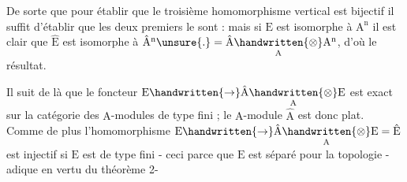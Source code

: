 De sorte que pour établir que le troisième homomorphisme vertical est bijectif il suffit d'établir que les deux premiers le sont : mais si $\mathrm E$ est isomorphe à $\mathrm A^{\mathrm n}$ il est clair que $\hat{\mathrm E}$ est isomorphe à $\hat{\mathrm A}^{\mathrm n}\unsure{.}=\hat{\mathrm A}\underset{\mathrm A}{\handwritten{\otimes}}\mathrm A^{\mathrm n}$, d'où le résultat.

Il suit de là que le foncteur $\mathrm E\handwritten{\to}\hat{\mathrm A}\underset{\mathrm A}{\handwritten{\otimes}}\mathrm E$ est exact sur la catégorie des $\mathrm A$-modules de type fini ; le $\mathrm A$-module $\hat{\mathrm A}$ est donc plat. Comme de plus l'homomorphisme $\mathrm E\handwritten{\to}\hat{\mathrm A}\underset{\mathrm A}{\handwritten{\otimes}}\mathrm E=\hat{\mathrm E}$ est injectif si $\mathrm E$ est de type fini - ceci parce que $\mathrm E$ est séparé pour la topologie \quad -adique en vertu du théorème 2-

